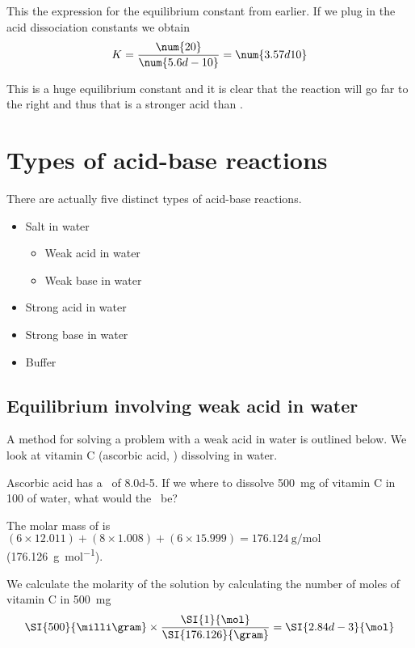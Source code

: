 \documentclass[../mit-general-chemistry.tex]{subfiles}
\begin{document}
This the expression for the equilibrium constant from earlier. If we
plug in the acid dissociation constants we obtain
\begin{equation*}
  K = \frac{\num{20}}{\num{5.6d-10}} = \num{3.57d10}
\end{equation*}

This is a huge equilibrium constant and it is clear that the reaction
will go far to the right and thus that  is a stronger acid
than .






\section{Types of acid-base reactions}

There are actually five distinct types of acid-base reactions.

\begin{itemize}
\item Salt in water
  \begin{itemize}
  \item Weak acid in water
  \item Weak base in water
  \end{itemize}
  \item Strong acid in water
  \item Strong base in water  
  \item Buffer
\end{itemize}



\subsection{Equilibrium involving weak acid in water}

A method for solving a problem with a weak acid in water is outlined
below. We look at vitamin C (ascorbic acid, ) dissolving
in water.

Ascorbic acid has a \Ka\ of \num{8.0d-5}. If we where to dissolve
\SI{500}{\milli\gram} of vitamin C in \SI{100}{\milliliter} of water,
what would the \pH\ be?

The molar mass of  is $(6\times 12.011) + (8\times 1.008)
+ (6\times 15.999) = \SI{176.124}{\gram\per\mol}$
(\SI{176.126}{\gram\per\mol}).

We calculate the molarity of the solution by calculating the number of
moles of vitamin C in \SI{500}{\milli\gram}
\begin{equation*}
  \SI{500}{\milli\gram}\times\frac{\SI{1}{\mol}}{\SI{176.126}{\gram}}
  = \SI{2.84d-3}{\mol}
\end{equation*}
\end{document}

